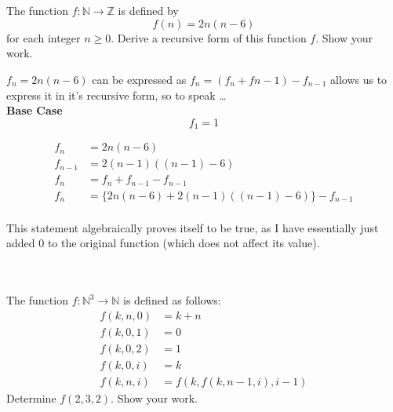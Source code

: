 \documentclass[12pt]{article}
\newcommand{\IN}{\mathbb{N}}
\newcommand{\IZ}{\mathbb{Z}}
\begin{document}
\begin{question} \\ \\
The function $f : \IN \rightarrow \IZ$ is defined by 
\[ f(n) = 2n ( n-6) 
\]
for each integer $n \geq 0$. Derive a recursive form of this 
function $f$. Show your work. 
\end{question} 

\begin{answer}
	$f_{n} = 2n(n-6)$ can be expressed  as $f_{n} = (f_{n} + f{n-1}) - f_{n-1}$ allows us to express it in it's recursive form, so to speak \dots \\
	
	\textbf{Base Case} 
	\\
	$$ f_{1} = 1 $$
	
	
	\begin{align*}
	 f_{n} &= 2n(n-6) \\
	 f_{n - 1} &= 2(n-1)( (n - 1) - 6 )\\
	 f_{n} &= f_{n} + f_{n-1} - f_{n-1} \\
	 f_{n} &= \{ 2n(n-6) + 2(n-1)( (n - 1) - 6 ) \} - f_{n-1} \\
	\end{align*}
	
This statement algebraically proves itself to be true, as I have essentially just added $0$ to the original function (which does not affect its value).
\end{answer}



\begin{question}  \\ \\
The function $f : \IN^3 \rightarrow \IN$ is defined as follows: 
\begin{align*}
      f(k,n,0) &= k+n  \\
      f(k,0,1) &= 0\\
      f(k,0,2) &= 1  \\
      f(k,0,i) &= k \\
      f(k,n,i) &= f ( k , f(k,n-1,i) , i-1)
\end{align*}
Determine $f(2,3,2)$. Show your work. 
\end{question} 
\end{document}

